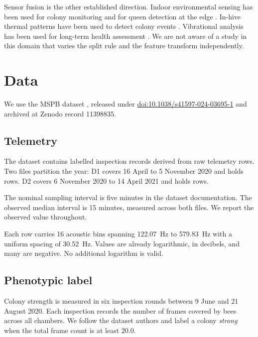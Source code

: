 ﻿\documentclass[review,12pt]{elsarticle}
\begin{document}
Sensor fusion is the other established direction.
Indoor environmental sensing has been used for colony monitoring
\cite{cecchi2020} and for queen detection at the edge
\cite{deluca2025tinyml}.
In-hive thermal patterns have been used to detect colony events
\cite{kridi2016}.
Vibrational analysis has been used for long-term health assessment
\cite{bencsik2011swarming,ramsey2020}.
We are not aware of a study in this domain that varies the split rule and the
feature transform independently.

\section{Data}

We use the MSPB dataset \cite{zhu2024mspb}, released under
\href{https://doi.org/10.1038/s41597-024-03695-1}{doi:10.1038/s41597-024-03695-1}
and archived at Zenodo record 11398835.

\subsection{Telemetry}

The dataset contains \LeakNInspectionsSource{} labelled inspection records
derived from \LeakRawRowsTotal{} raw telemetry rows.
Two files partition the year: D1 covers 16 April to 5 November 2020 and holds
\LeakRawRowsDOne{} rows.
D2 covers 6 November 2020 to 14 April 2021 and holds \LeakRawRowsDTwo{} rows.

The nominal sampling interval is five minutes in the dataset documentation.
The observed median interval is 15 minutes, measured across both files.
We report the observed value throughout.

Each row carries 16 acoustic bins spanning \SI{122.07}{\hertz} to
\SI{579.83}{\hertz} with a uniform spacing of \SI{30.52}{\hertz}.
Values are already logarithmic, in decibels, and many are negative.
No additional logarithm is valid.

\subsection{Phenotypic label}

Colony strength is measured in six inspection rounds between 9 June and
21 August 2020.
Each inspection records the number of frames covered by bees across all
chambers.
We follow the dataset authors and label a colony \emph{strong} when the total
frame count is at least 20.0.
\end{document}

